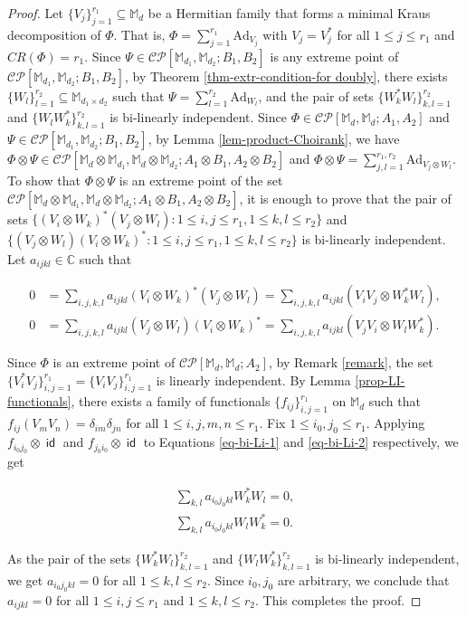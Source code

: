 \documentclass[10pt,reqno]{amsart}
\theoremstyle{definition}
\theoremstyle{plain}
\theoremstyle{remark}
\renewcommand{\sf}[1]{\textsf{#1}}
\newcommand{\mbb}[1]{\mathbb{#1}}
\newcommand{\msc}[1]{\mathscr{#1}}
\newcommand{\M}[1]{\mbb{M}_{#1}}%
\DeclareMathOperator{\id}{\sf{id}}
\numberwithin{equation}{section}%
\begin{document}
   \begin{proof} 
   	Let $\{V_j\}_{j=1}^{r_1}\subseteq\M{d}$ be a Hermitian family that forms a minimal Kraus decomposition of $\Phi$. That is,  $\Phi=\sum_{j=1}^{r_1}\mathrm{Ad}_{V_j}$ with $V_j=V_j^*$ for all $1\leq j \leq r_1$ and $CR(\Phi)=r_1$. Since $\Psi\in\msc{CP}[\M{d_1},\M{d_2}; B_1,B_2]$ is any extreme point of $\msc{CP}[\M{d_1},\M{d_2};B_1, B_2]$, by Theorem \ref{thm-extr-condition-for doubly}, there exists $\{W_l\}_{l=1}^{r_2}\subseteq\M{d_1\times d_2}$ such that $\Psi=\sum_{l=1}^{r_2}\mathrm{Ad}_{W_l}$, and the pair of sets $\{W_k^*W_l\}_{k,l=1}^{r_2}$ and $\{W_lW_k^*\}_{k,l=1}^{r_2}$ is bi-linearly independent. Since $\Phi\in\msc{CP}[\M{d},\M{d}; A_1,A_2]$ and $\Psi\in\msc{CP}[\M{d_1},\M{d_2}; B_1,B_2]$, by Lemma \ref{lem-product-Choirank}, we have $\Phi\otimes\Psi\in\msc{CP}[\M{d}\otimes\M{d_1},\M{d}\otimes\M{d_2}; A_1\otimes B_1,A_2\otimes B_2]$ and $\Phi\otimes\Psi=\sum_{j,l=1}^{r_1,r_2}\mathrm{Ad}_{V_j\otimes W_l}$. To show that $\Phi\otimes\Psi$ is an extreme point of the set $\msc{CP}[\M{d}\otimes\M{d_1},\M{d}\otimes\M{d_2}; A_1\otimes B_1, A_2\otimes B_2]$, it is enough to prove that the pair of sets $\{(V_i\otimes W_k)^*(V_j\otimes W_l):1\leq i,j\leq r_1, 1\leq k,l\leq r_2\}$ and $\{(V_j\otimes W_l)(V_i\otimes W_k)^*:1\leq i,j\leq r_1, 1\leq k,l\leq r_2\}$ is bi-linearly independent. Let $a_{ijkl}\in\mbb{C}$ such that
   	
   	\begin{align}
   		0&=\sum_{i,j,k,l}a_{ijkl}(V_i\otimes W_k)^*(V_j\otimes W_l)=\sum_{i,j,k,l}a_{ijkl}(V_iV_j\otimes W_k^*W_l) \label{eq-bi-Li-1},\\
   		0&=\sum_{i,j,k,l}a_{ijkl}(V_j\otimes W_l)(V_i\otimes W_k)^*=\sum_{i,j,k,l}a_{ijkl}(V_jV_i\otimes W_lW_k^*)\label{eq-bi-Li-2}.
   	\end{align}
   	
   	Since $\Phi$ is an extreme point of $\msc{CP}[\M{d},\M{d};A_2]$, by Remark \ref{remark}, the set $\{V_i^*V_j\}_{i,j=1}^{r_1}=\{V_iV_j\}_{i,j=1}^{r_1}$ is linearly independent. By Lemma \ref{prop-LI-functionals}, there exists a family of functionals $\{f_{ij}\}_{i,j=1}^{r_1}$ on $\M{d}$ such that $f_{ij}(V_mV_n)=\delta_{im}\delta_{jn}$ for all $1\leq i,j,m,n\leq r_1$. Fix $1\leq i_0,j_0\leq r_1$. Applying $f_{i_0j_0}\otimes \id$ and $f_{j_0i_0}\otimes\id$ to Equations \ref{eq-bi-Li-1} and \ref{eq-bi-Li-2} respectively, we get
   	
   	\begin{align*}
   		\sum_{k,l}a_{i_0j_0kl}W_k^*W_l=0,\\
   		\sum_{k,l}a_{i_0j_0kl}W_lW_k^*=0.
   	\end{align*}
   	
   	As the pair of the sets $\{W_k^*W_l\}_{k,l=1}^{r_2}$ and $\{W_lW_k^*\}_{k,l=1}^{r_2}$ is bi-linearly independent, we get $a_{i_0j_0kl}=0$ for all $1\leq k,l\leq r_2$. Since $i_0,j_0$ are arbitrary, we conclude that $a_{ijkl}=0$ for all $1\leq i,j\leq r_1$ and $1\leq k,l\leq r_2$. This completes the proof.
   \end{proof}
   
\end{document}
